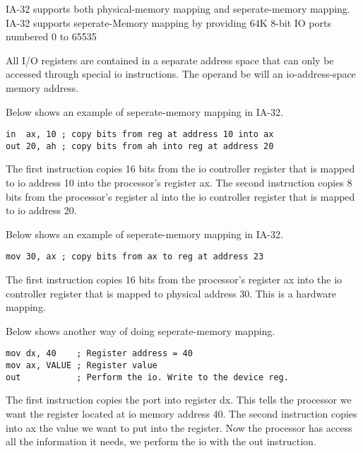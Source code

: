 IA-32 supports both physical-memory mapping and seperate-memory mapping. 
IA-32 supports seperate-Memory mapping by providing
64K 8-bit IO ports numbered 0 to 65535



All I/O registers are contained in a separate address space that can 
only be accessed through special io instructions. 
The operand be will an io-address-space memory address.

\begin{example}
Below shows an example of seperate-memory mapping in IA-32.

\begin{lstlisting}
in  ax, 10 ; copy bits from reg at address 10 into ax
out 20, ah ; copy bits from ah into reg at address 20
\end{lstlisting}
The first instruction copies 16 bits from the io controller register
that is mapped to io address 10 into the processor's register ax. 
The second instruction copies 8 bits from the processor's register al
into the io controller register that is mapped to io address 20. 

\end{example}

\begin{example}
Below shows an example of seperate-memory mapping in IA-32.

\begin{lstlisting}
mov 30, ax ; copy bits from ax to reg at address 23
\end{lstlisting}
The first instruction copies 16 bits from the processor's register ax
into the io controller register that is mapped to physical address 30. 
This is a hardware mapping.
\end{example}

\begin{example}
Below shows another way of doing seperate-memory mapping.
\begin{lstlisting}
mov dx, 40    ; Register address = 40
mov ax, VALUE ; Register value
out           ; Perform the io. Write to the device reg.
\end{lstlisting}
The first instruction copies the port into register dx. 
This tells the processor we want the register located at 
io memory address 40. The second instruction copies 
into ax the value we want to put into the register.
Now the processor has access all the information it needs, 
we perform the io with the out instruction. 
\end{example}



